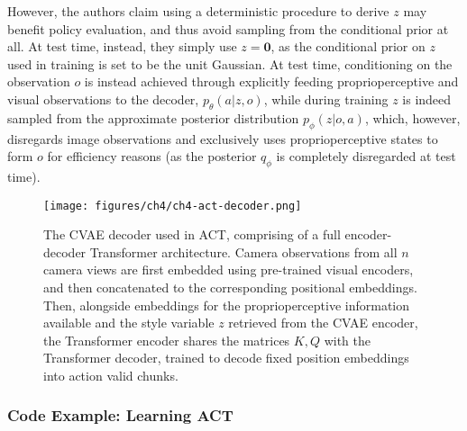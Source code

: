 However, the authors claim using a deterministic procedure to derive \( z \) may benefit policy evaluation, and thus avoid sampling from the conditional prior at all.
At test time, instead, they simply use \( z = \mathbf{0} \), as the conditional prior on \( z \) used in training is set to be the unit Gaussian.
At test time, conditioning on the observation \( o \) is instead achieved through explicitly feeding proprioperceptive and visual observations to the decoder, \( p_\theta(a \vert z, o) \), while during training \( z \) is indeed sampled from the approximate posterior distribution \(p_\phi(z \vert o, a)\), which, however, disregards image observations and exclusively uses proprioperceptive states to form \( o \) for efficiency reasons (as the posterior \(q_\phi \) is completely disregarded at test time).

\begin{figure}
    \centering
    \texttt{[image: figures/ch4/ch4-act-decoder.png]}
    \caption{The CVAE decoder used in ACT, comprising of a full encoder-decoder Transformer architecture. Camera observations from all \( n \) camera views are first embedded using pre-trained visual encoders, and then concatenated to the corresponding positional embeddings. Then, alongside embeddings for the proprioperceptive information available and the style variable \(z\) retrieved from the CVAE encoder, the Transformer encoder shares the matrices \( K,Q \) with the Transformer decoder, trained to decode fixed position embeddings into action valid chunks.}
    \label{fig:ch4-act-decoder}
\end{figure}


\subsubsection{Code Example: Learning ACT}

